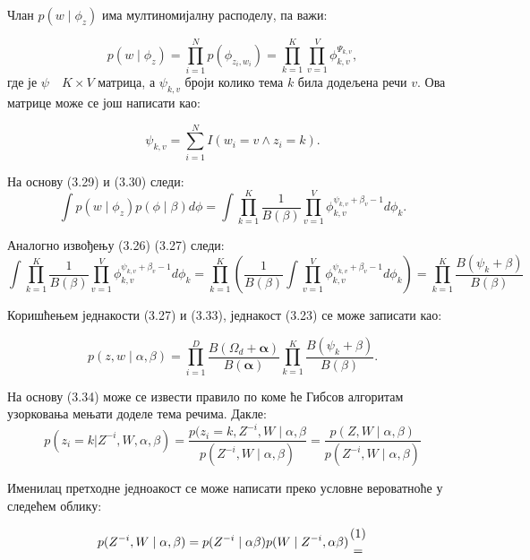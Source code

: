 Члан $p(w\mid\phi_z)$ има мултиномијалну расподелу, па важи:

\begin{equation}
p(w\mid\phi_z) = \prod_{i=1}^N p(\phi_{z_i,w_i}) = \prod_{k=1}^K\prod_{v=1}^V\phi_{k,v}^{\Psi_{k,v}},
\end{equation}
где је $\psi \quad K \times V$ матрица, а $\psi_{k,v}$ броји колико тема $k$ била додељена речи $v$. Ова матрице може се још написати као:

\begin{equation}
\psi_{k,v} = \sum_{i=1}^N I(w_i=v \wedge z_i = k).
\end{equation} 

На основу (3.29) и (3.30) следи:
\begin{equation}
\int p(w \mid \phi_z)p(\phi \mid \beta)d\phi = \int \prod_{k=1}^K \frac{1}{B(\beta)}\prod_{v=1}^V\phi_{k,v}^{\psi_{k,v}+\beta_v -1}d\phi_k.
\end{equation}

Аналогно извођењу (3.26) (3.27) следи:
\begin{equation}
\int \prod_{k=1}^K \frac{1}{B(\beta)}\prod_{v=1}^V\phi_{k,v}^{\psi_{k,v}+\beta_v -1}d\phi_k =\prod_{k=1}^K (\frac{1}{B(\beta)} \int \prod_{v=1}^V\phi_{k,v}^{\psi_{k,v}+\beta_v -1}d\phi_k) = \prod_{k=1}^K \frac{B(\psi_k +\beta)}{B(\beta)}
\end{equation}

Коришћењем једнакости (3.27) и (3.33), једнакост (3.23) се може записати као:

\begin{equation}
p(z,w \mid \alpha,\beta) = \prod_{i=1}^D \frac{B(\Omega_d+\mathbf{\alpha})}{B(\mathbf{\alpha})}\prod_{k=1}^K \frac{B(\psi_k +\beta)}{B(\beta)}.
\end{equation}

На основу (3.34) може се извести правило по коме ће Гибсов алгоритам узорковања мењати доделе тема речима. Дакле:
\begin{equation}
p(z_i=k|Z^{-i},W,\alpha,\beta) = \frac{p(z_i=k,Z^{-i},W \mid \alpha,\beta}{p(Z^{-i},W \mid \alpha,\beta)} = \frac{p(Z,W \mid \alpha,\beta)}{p(Z^{-i},W \mid \alpha,\beta)}
\end{equation}

Именилац претходне једноакост се може написати преко условне вероватноће у следећем облику:

\begin{equation}
p(Z^{-i},W \mid \alpha,\beta) = p(Z^{-i}\mid \alpha\beta)p(W \mid Z^{-i},\alpha\beta ){(1) \atop = }
\end{equation}

